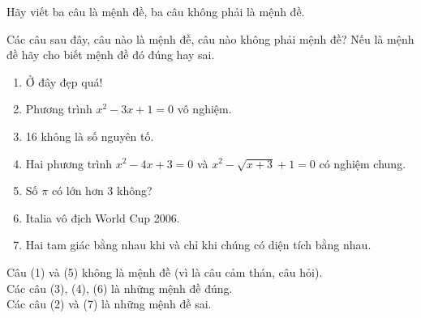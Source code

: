 \begin{bt}%
	Hãy viết ba câu là mệnh đề, ba câu không phải là mệnh đề.
\end{bt}

\begin{bt}%
	Các câu sau đây, câu nào là mệnh đề, câu nào không phải mệnh đề? Nếu là mệnh đề hãy cho biết mệnh đề đó đúng hay sai.
	\begin{enumerate}
		\item Ở đây đẹp quá!
		\item Phương trình $x^2-3x+1=0$ vô nghiệm.
		\item 16 không là số nguyên tố.
		\item Hai phương trình $x^2-4x+3=0$ và $x^2-\sqrt{x+3}+1=0$ có nghiệm chung.
		\item Số $\pi$ có lớn hơn 3 không?
		\item Italia vô địch World Cup 2006.
		\item Hai tam giác bằng nhau khi và chỉ khi chúng có diện tích bằng nhau.
	\end{enumerate}
	\loigiai
	{Câu (1) và (5) không là mệnh đề (vì là câu cảm thán, câu hỏi).\\
		Các câu (3), (4), (6) là những mệnh đề đúng.\\
		Các câu (2) và (7) là những mệnh đề sai.	
	}
\end{bt}

